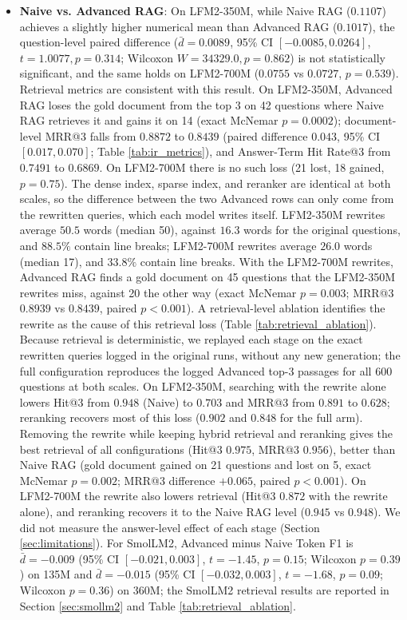 \documentclass[10pt]{article}
\begin{document}
\begin{itemize}
    \item \textbf{Naive vs. Advanced RAG}: On LFM2-350M, while Naive RAG ($0.1107$) achieves a slightly higher numerical mean than Advanced RAG ($0.1017$), the question-level paired difference ($\bar{d} = 0.0089$, 95\% CI $[-0.0085, 0.0264]$, $t=1.0077, p=0.314$; Wilcoxon $W=34329.0, p=0.862$) is not statistically significant, and the same holds on LFM2-700M ($0.0755$ vs $0.0727$, $p=0.539$). Retrieval metrics are consistent with this result. On LFM2-350M, Advanced RAG loses the gold document from the top 3 on 42 questions where Naive RAG retrieves it and gains it on 14 (exact McNemar $p=0.0002$); document-level MRR@3 falls from $0.8872$ to $0.8439$ (paired difference $0.043$, 95\% CI $[0.017, 0.070]$; Table \ref{tab:ir_metrics}), and Answer-Term Hit Rate@3 from $0.7491$ to $0.6869$. On LFM2-700M there is no such loss (21 lost, 18 gained, $p=0.75$). The dense index, sparse index, and reranker are identical at both scales, so the difference between the two Advanced rows can only come from the rewritten queries, which each model writes itself. LFM2-350M rewrites average $50.5$ words (median 50), against $16.3$ words for the original questions, and $88.5\%$ contain line breaks; LFM2-700M rewrites average $26.0$ words (median 17), and $33.8\%$ contain line breaks. With the LFM2-700M rewrites, Advanced RAG finds a gold document on 45 questions that the LFM2-350M rewrites miss, against 20 the other way (exact McNemar $p=0.003$; MRR@3 $0.8939$ vs $0.8439$, paired $p<0.001$). A retrieval-level ablation identifies the rewrite as the cause of this retrieval loss (Table \ref{tab:retrieval_ablation}). Because retrieval is deterministic, we replayed each stage on the exact rewritten queries logged in the original runs, without any new generation; the full configuration reproduces the logged Advanced top-3 passages for all 600 questions at both scales. On LFM2-350M, searching with the rewrite alone lowers Hit@3 from $0.948$ (Naive) to $0.703$ and MRR@3 from $0.891$ to $0.628$; reranking recovers most of this loss ($0.902$ and $0.848$ for the full arm). Removing the rewrite while keeping hybrid retrieval and reranking gives the best retrieval of all configurations (Hit@3 $0.975$, MRR@3 $0.956$), better than Naive RAG (gold document gained on 21 questions and lost on 5, exact McNemar $p=0.002$; MRR@3 difference $+0.065$, paired $p<0.001$). On LFM2-700M the rewrite also lowers retrieval (Hit@3 $0.872$ with the rewrite alone), and reranking recovers it to the Naive RAG level ($0.945$ vs $0.948$). We did not measure the answer-level effect of each stage (Section \ref{sec:limitations}). For SmolLM2, Advanced minus Naive Token F1 is $\bar{d}=-0.009$ (95\% CI $[-0.021, 0.003]$, $t=-1.45$, $p=0.15$; Wilcoxon $p=0.39$) on 135M and $\bar{d}=-0.015$ (95\% CI $[-0.032, 0.003]$, $t=-1.68$, $p=0.09$; Wilcoxon $p=0.36$) on 360M; the SmolLM2 retrieval results are reported in Section \ref{sec:smollm2} and Table \ref{tab:retrieval_ablation}.

\end{itemize}
\end{document}
